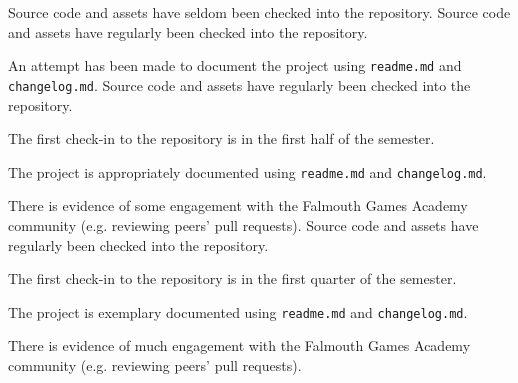 \documentclass{../fal_assignment}
\begin{document}
\begin{markingrubric}
        \grade 		Source code and assets have seldom been checked into the repository.
        \grade 		Source code and assets have regularly been checked into the repository.
        \par 		An attempt has been made to document the project using \texttt{readme.md} and \texttt{changelog.md}.
        \grade 		Source code and assets have regularly been checked into the repository.
        \par  		The first check-in to the repository is in the first half of the semester.
        \par 		The project is appropriately documented using \texttt{readme.md} and \texttt{changelog.md}.
        \par 		There is evidence of some engagement with the Falmouth Games Academy community (e.g. reviewing peers' pull requests).
        \grade 		Source code and assets have regularly been checked into the repository.
        \par  		The first check-in to the repository is in the first quarter of the semester.
        \par 		The project is exemplary documented using \texttt{readme.md} and \texttt{changelog.md}.
        \par 		There is evidence of much engagement with the Falmouth Games Academy community (e.g. reviewing peers' pull requests).
\end{markingrubric}
\end{document}
